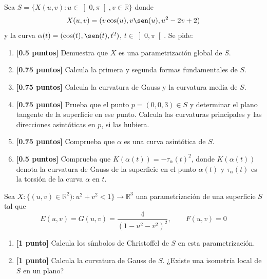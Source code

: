 \documentclass[12pt]{article}
\begin{document}
    \begin{ejercicio}
        Sea $S = \{X(u,v) : u\in \left]0,\pi\right[, v\in \mathbb{R}\}$ donde
        \begin{equation*}
            X(u,v) = (v\cos(u), v\sen(u), u^2-2v+2)
        \end{equation*}
        y la curva $\alpha(t) = (\cos(t), \sen(t),t^2)$, $t\in \left]0,\pi\right[$. Se pide:
        \begin{enumerate}[label=\alph*)]
            \item \textbf{[0.5 puntos]} Demuestra que $X$ es una parametrización global de $S$.
            \item \textbf{[0.75 puntos]} Calcula la primera y segunda formas fundamentales de $S$.
            \item \textbf{[0.75 puntos]} Calcula la curvatura de Gauss y la curvatura media de $S$.
            \item \textbf{[0.75 puntos]} Prueba que el punto $p=(0,0,3)\in S$ y determinar el plano tangente de la superficie en ese punto. Calcula las curvaturas principales y las direcciones asintóticas en $p$, si las hubiera.
            \item \textbf{[0.75 puntos]} Comprueba que $\alpha$ es una curva asintótica de $S$.
            \item \textbf{[0.5 puntos]} Comprueba que $K(\alpha(t)) = -\tau_\alpha(t)^2$, donde $K(\alpha(t))$ denota la curvatura de Gauss de la superficie en el punto $\alpha(t)$ y $\tau_\alpha(t)$ es la torsión de la curva $\alpha$ en $t$.
        \end{enumerate}
    \end{ejercicio}

    \begin{ejercicio}
        Sea $X:\{(u,v)\in \mathbb{R}^2) : u^2+v^2 < 1\}\to \mathbb{R}^3$ una parametrización de una superficie $S$ tal que
        \begin{equation*}
            E(u,v) = G(u,v) = \frac{4}{{(1-u^2-v^2)}^{2}}, \qquad F(u,v) = 0
        \end{equation*}
        \begin{enumerate}[label=\alph*)]
            \item \textbf{[1 punto]} Calcula los símbolos de Christoffel de $S$ en esta parametrización.
            \item \textbf{[1 punto]} Calcula la curvatura de Gauss de $S$. ¿Existe una isometría local de $S$ en un plano?
        \end{enumerate}
    \end{ejercicio}
\end{document}
